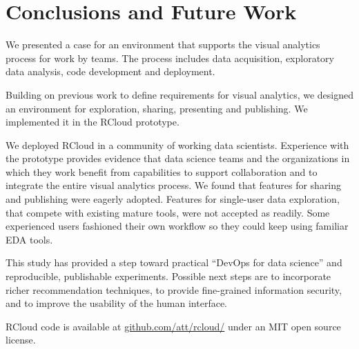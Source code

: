 \section{Conclusions and Future Work}


We presented a case for an environment that supports the
visual analytics process for work by teams. The process
includes data acquisition, exploratory data analysis,
code development and deployment.

Building on previous work to define requirements for
visual analytics, we designed an environment
for exploration, sharing, presenting and publishing.
We implemented it in the RCloud prototype.

We deployed RCloud in a community of working data scientists.
Experience with the prototype provides evidence that data
science teams and the organizations in which they work benefit from
capabilities to support collaboration and to integrate
the entire visual analytics process. We found that features for
sharing and publishing were eagerly adopted. Features for 
single-user data exploration, that compete with existing mature
tools, were not accepted as readily. Some experienced users
fashioned their own workflow so they could keep using familiar EDA tools.

This study has provided a step toward practical ``DevOps for data science''
and reproducible, publishable experiments.  Possible next steps are
to incorporate richer recommendation techniques, to provide fine-grained
information security, and to improve the usability of the human interface.

RCloud code is available at \url{github.com/att/rcloud/}
under an MIT open source license.
